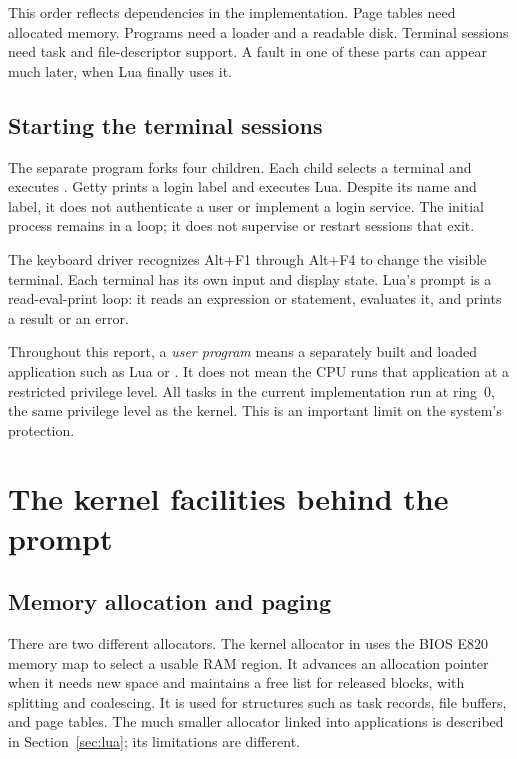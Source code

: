 \documentclass[11pt,a4paper]{scrartcl}
\newcommand{\code}[1]{\texttt{\detokenize{#1}}}
\begin{document}
This order reflects dependencies in the implementation. Page tables need
allocated memory. Programs need a loader and a readable disk. Terminal
sessions need task and file-descriptor support. A fault in one of these
parts can appear much later, when Lua finally uses it.

\subsection{Starting the terminal sessions}

The separate \code{init} program forks four children. Each child selects
a terminal and executes \code{getty.elf}. Getty prints a login label and
executes Lua. Despite its name and label, it does not authenticate a user
or implement a login service. The initial process remains in a loop; it
does not supervise or restart sessions that exit.

The keyboard driver recognizes Alt+F1 through Alt+F4 to change the visible
terminal. Each terminal has its own input and display state. Lua's prompt
is a read-eval-print loop: it reads an expression or statement, evaluates
it, and prints a result or an error.

Throughout this report, a \emph{user program} means a separately built and
loaded application such as Lua or \code{init}. It does not mean the CPU
runs that application at a restricted privilege level. All tasks in the
current implementation run at ring~0, the same privilege level as the
kernel. This is an important limit on the system's protection.

\section{The kernel facilities behind the prompt}
\label{sec:kernel}

\subsection{Memory allocation and paging}

There are two different allocators. The kernel allocator in
\code{stage2/mem.c} uses the BIOS E820 memory map to select a usable RAM
region. It advances an allocation pointer when it needs new space and
maintains a free list for released blocks, with splitting and coalescing.
It is used for structures such as task records, file buffers, and page
tables. The much smaller allocator linked into applications is described
in Section~\ref{sec:lua}; its limitations are different.
\end{document}
